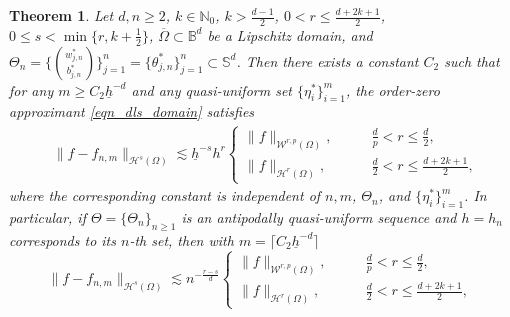 \documentclass{article}
\numberwithin{equation}{section}
\newtheorem{theorem}{Theorem}
\def\NN{\mathbb{N}}
\def\BB{\mathbb{B}}
\def\SS{\mathbb{S}}
\begin{document}
\begin{theorem}\label{thm:leastsquareOmega}
    Let $d,n\geq2$, $k\in\NN_0$, $k> \frac{d-1}{2}$, $0<r\leq\frac{d+2k+1}{2}$, $0\leq s<\min\{r,k+\frac{1}{2}\}$, $\overline\Omega\subset\BB^d$ be a Lipschitz domain, and $\Theta_n=\displaystyle\Bigg\{\binom{w_{j,n}^*}{b_{j,n}^*}\Bigg\}_{j=1}^n=\{\theta_{j,n}^*\}_{j=1}^n\subset\SS^d$. Then there exists a constant $C_2$ such that for any $m\geq C_2\underline{h}^{-d}$ and any quasi-uniform set $\{\eta_i^*\}_{i=1}^m$, the order-zero approximant \eqref{eqn_dls_domain} satisfies
    \begin{equation}\label{eqn_main_ls_determ_Omega}
    \begin{split}
        &\|f-f_{n,m}\|_{\mathcal{H}^s(\Omega)}\lesssim \underline h^{-s}h^{r}\left\{\begin{array}{ll}
            \|f\|_{\mathcal{W}^{r,p}(\Omega)}, &\qquad \frac dp<r\leq\frac{d}{2},  \\
            \|f\|_{\mathcal{H}^r(\Omega)}, &\qquad \frac{d}{2}<r\leq\frac{d+2k+1}{2},
        \end{array}\right.
    \end{split}
    \end{equation}
    where the corresponding constant is independent of $n,m$, $\Theta_n$, and $\{\eta_i^*\}_{i=1}^m$. In particular, if $\Theta=\{\Theta_n\}_{n\ge1}$ is an antipodally quasi-uniform sequence and $h=h_n$ corresponds to its $n$-th set, then with $m=\lceil C_2\underline h^{-d}\rceil$
    \begin{equation}
    \|f-f_{n,m}\|_{\mathcal{H}^s(\Omega)}\lesssim n^{-\frac{r-s}{d}}\left\{\begin{array}{ll}
            \|f\|_{\mathcal{W}^{r,p}(\Omega)}, &\qquad \frac dp<r\leq\frac{d}{2},  \\
            \|f\|_{\mathcal{H}^r(\Omega)}, &\qquad \frac{d}{2}<r\leq\frac{d+2k+1}{2},
        \end{array}\right.
    \end{equation}
\end{theorem}
\end{document}
